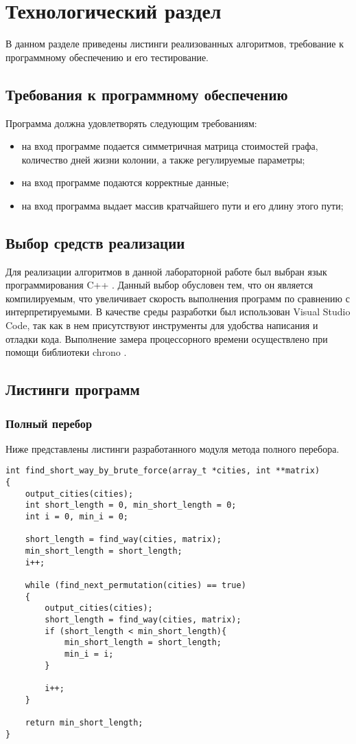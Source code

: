 \chapter{Технологический раздел}
В данном разделе приведены листинги реализованных алгоритмов, требование к программному обеспечению и его тестирование.

\section{Требования к программному обеспечению}
Программа должна удовлетворять следующим требованиям:
\begin{itemize}
	\item на вход программе подается симметричная матрица стоимостей графа, количество дней жизни колонии, а также регулируемые параметры;
	\item на вход программе подаются корректные данные;
	\item на вход программа выдает массив кратчайшего пути и его длину этого пути;
\end{itemize}


\section{Выбор средств реализации}
Для реализации алгоритмов в данной лабораторной работе был выбран язык программирования C++ \cite{c++}. Данный выбор обусловен тем, что он является компилируемым, что увеличивает скорость выполнения программ по сравнению с интерпретируемыми. В качестве среды разработки был использован Visual Studio Code\cite{vs}, так как в нем присутствуют инструменты для удобства написания и отладки кода. Выполнение замера процессорного времени осуществлено при помощи библиотеки chrono \cite{chrono}.

\section{Листинги программ}
\subsection{Полный перебор}
Ниже представлены листинги разработанного модуля метода полного перебора.
\begin{lstlisting}[label = brute_force, caption=Программный код алгоритма полного перебора.]
int find_short_way_by_brute_force(array_t *cities, int **matrix)
{
	output_cities(cities);
	int short_length = 0, min_short_length = 0;
	int i = 0, min_i = 0;
	
	short_length = find_way(cities, matrix);
	min_short_length = short_length;
	i++;
	
	while (find_next_permutation(cities) == true)
	{
		output_cities(cities);
		short_length = find_way(cities, matrix);
		if (short_length < min_short_length){
			min_short_length = short_length;
			min_i = i;
		}
		
		i++;
	}
	
	return min_short_length;
}
\end{lstlisting}

